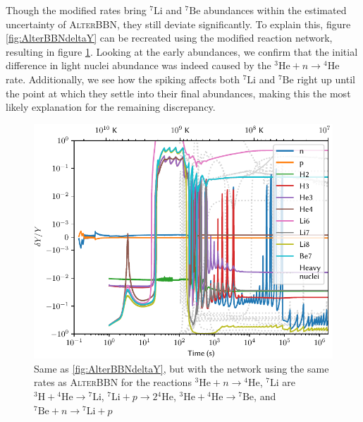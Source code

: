 Though the modified rates bring ${}^7\text{Li}$ and ${}^7\text{Be}$ abundances within the estimated uncertainty of \textsc{AlterBBN}, they still deviate significantly. To explain this, figure \ref{fig:AlterBBNdeltaY} can be recreated using the modified reaction network, resulting in figure \ref{fig:AlterratesBBNdeltaY}. Looking at the early abundances, we confirm that the initial difference in light nuclei abundance was indeed caused by the ${}^3\text{He}+n\rightarrow {}^4\text{He}$ rate. Additionally, we see how the spiking affects both ${}^7\text{Li}$ and ${}^7\text{Be}$ right up until the point at which they settle into their final abundances, making this the most likely explanation for the remaining discrepancy.

\begin{figure}[ht]
    \includegraphics[width=5.1in]{figures/AlterratesBBNdeltaY.pdf}
    \caption{Same as \cref{fig:AlterBBNdeltaY}, but with the network using the same rates as \textsc{AlterBBN} for the reactions ${}^3\text{He}+n\rightarrow {}^4\text{He}$, ${}^7\text{Li}$ are ${}^3\text{H}+{}^4\text{He}\rightarrow {}^7\text{Li}$, ${}^7\text{Li} + p\rightarrow 2{}^4\text{He}$, ${}^3\text{He}+{}^4\text{He}\rightarrow {}^7\text{Be}$, and ${}^7\text{Be} + n\rightarrow {}^7\text{Li} + p$}
    \label{fig:AlterratesBBNdeltaY}
\end{figure}



